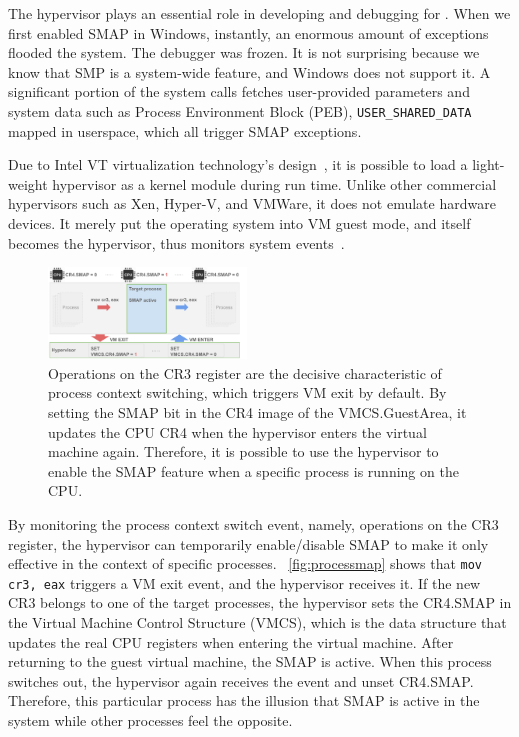 The hypervisor plays an essential role in developing and debugging for \name. When we first enabled SMAP in Windows, instantly, an enormous amount of exceptions flooded the system. The debugger was frozen.  It is not surprising because we know that SMP is a system-wide feature, and Windows does not support it. A significant portion of the system calls fetches user-provided parameters and system data such as Process Environment Block (PEB), \texttt{USER\_SHARED\_DATA} mapped in userspace, which all trigger SMAP exceptions.

Due to Intel VT virtualization technology's design~\cite{neiger2006intel}, it is possible to load a light-weight hypervisor as a kernel module during run time. Unlike other commercial hypervisors such as Xen, Hyper-V, and VMWare, it does not emulate hardware devices. It merely put the operating system into VM guest mode, and itself becomes the hypervisor, thus monitors system events~\cite{howtohide}.

\begin{figure}[th]
  \includegraphics[width=0.47\textwidth]{figures/processmap4}
  \centering
  \caption{Operations on the CR3 register are the decisive characteristic of process context switching, which triggers VM exit by default. By setting the SMAP bit in the CR4 image of the VMCS.GuestArea, it updates the CPU CR4 when the hypervisor enters the virtual machine again. Therefore, it is possible to use the hypervisor to enable the SMAP feature when a specific process is running on the CPU.}
  \label{fig:processmap}
\end{figure}


By monitoring the process context switch event, namely, operations on the CR3 register, the hypervisor can temporarily enable/disable SMAP to make it only effective in the context of specific processes. ~\autoref{fig:processmap} shows that \texttt{mov cr3, eax} triggers a VM exit event, and the hypervisor receives it. If the new CR3 belongs to one of the target processes, the hypervisor sets the CR4.SMAP in the Virtual Machine Control Structure (VMCS), which is the data structure that updates the real CPU registers when entering the virtual machine. After returning to the guest virtual machine, the SMAP is active. When this process switches out, the hypervisor again receives the event and unset CR4.SMAP. Therefore, this particular process has the illusion that SMAP is active in the system while other processes feel the opposite.

